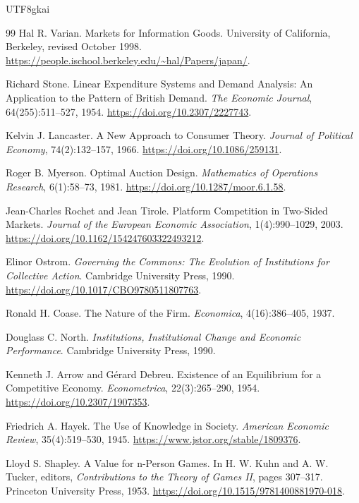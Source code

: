 \documentclass[12pt,a4paper,openany]{report}
\begin{document}
\begin{CJK*}{UTF8}{gkai}
\begin{thebibliography}{99}
Hal R. Varian.
\newblock Markets for Information Goods.
\newblock University of California, Berkeley, revised October 1998.
\newblock \url{https://people.ischool.berkeley.edu/~hal/Papers/japan/}.

Richard Stone.
\newblock Linear Expenditure Systems and Demand Analysis: An Application to the Pattern of British Demand.
\newblock \emph{The Economic Journal}, 64(255):511--527, 1954.
\newblock \url{https://doi.org/10.2307/2227743}.

Kelvin J. Lancaster.
\newblock A New Approach to Consumer Theory.
\newblock \emph{Journal of Political Economy}, 74(2):132--157, 1966.
\newblock \url{https://doi.org/10.1086/259131}.

Roger B. Myerson.
\newblock Optimal Auction Design.
\newblock \emph{Mathematics of Operations Research}, 6(1):58--73, 1981.
\newblock \url{https://doi.org/10.1287/moor.6.1.58}.

Jean-Charles Rochet and Jean Tirole.
\newblock Platform Competition in Two-Sided Markets.
\newblock \emph{Journal of the European Economic Association}, 1(4):990--1029, 2003.
\newblock \url{https://doi.org/10.1162/154247603322493212}.

Elinor Ostrom.
\newblock \emph{Governing the Commons: The Evolution of Institutions for Collective Action}.
\newblock Cambridge University Press, 1990.
\newblock \url{https://doi.org/10.1017/CBO9780511807763}.

Ronald H. Coase.
\newblock The Nature of the Firm.
\newblock \emph{Economica}, 4(16):386--405, 1937.

Douglass C. North.
\newblock \emph{Institutions, Institutional Change and Economic Performance}.
\newblock Cambridge University Press, 1990.

Kenneth J. Arrow and G\'erard Debreu.
\newblock Existence of an Equilibrium for a Competitive Economy.
\newblock \emph{Econometrica}, 22(3):265--290, 1954.
\newblock \url{https://doi.org/10.2307/1907353}.

Friedrich A. Hayek.
\newblock The Use of Knowledge in Society.
\newblock \emph{American Economic Review}, 35(4):519--530, 1945.
\newblock \url{https://www.jstor.org/stable/1809376}.

Lloyd S. Shapley.
\newblock A Value for n-Person Games.
\newblock In H. W. Kuhn and A. W. Tucker, editors,
\emph{Contributions to the Theory of Games II}, pages 307--317.
Princeton University Press, 1953.
\newblock \url{https://doi.org/10.1515/9781400881970-018}.


\end{thebibliography}
\end{CJK*}
\end{document}
